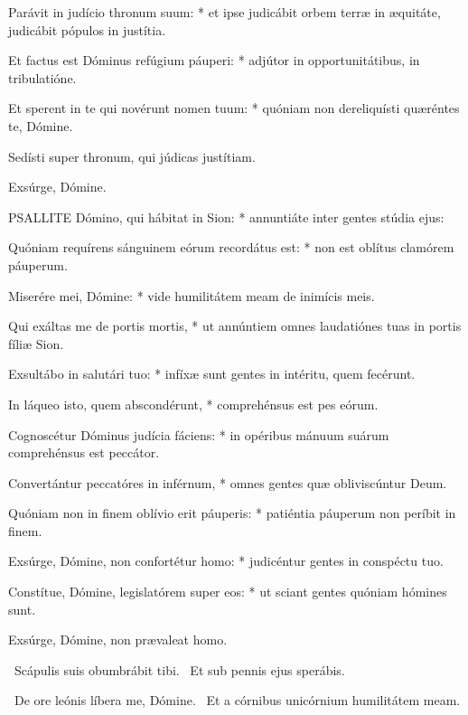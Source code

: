 Parávit in judício thronum suum: * et ipse judicábit orbem terræ in æquitáte, judicábit pópulos in justítia.

Et factus est Dóminus refúgium páuperi: * adjútor in opportunitátibus, in tribulatióne.

Et sperent in te qui novérunt nomen tuum: * quóniam non dereliquísti quæréntes te, Dómine.

 Sedísti super thronum, qui júdicas justítiam.

 Exsúrge, Dómine.


\lettrine[lines=2]{P}{SALLITE} Dómino, qui hábitat in Sion: * annuntiáte inter gentes stúdia ejus:

Quóniam requírens sánguinem eórum recordátus est: * non est oblítus clamórem páuperum.

Miserére mei, Dómine: * vide humilitátem meam de inimícis meis.

Qui exáltas me de portis mortis, * ut annúntiem omnes laudatiónes tuas in portis fíliæ Sion.

Exsultábo in salutári tuo: * infíxæ sunt gentes in intéritu, quem fecérunt.

In láqueo isto, quem abscondérunt, * comprehénsus est pes eórum.

Cognoscétur Dóminus judícia fáciens: * in opéribus mánuum suárum comprehénsus est peccátor.

Convertántur peccatóres in inférnum, * omnes gentes quæ obliviscúntur Deum.

Quóniam non in finem oblívio erit páuperis: * patiéntia páuperum non períbit in finem.

Exsúrge, Dómine, non confortétur homo: * judicéntur gentes in conspéctu tuo.

Constítue, Dómine, legislatórem super eos: * ut sciant gentes quóniam hómines sunt.


 Exsúrge, Dómine, non prævaleat homo.


\V\ Scápulis suis obumbrábit tibi. \R\ Et sub pennis ejus sperábis.


\V\ De ore leónis líbera me, Dómine. \R\ Et a córnibus unicórnium humilitátem meam.


